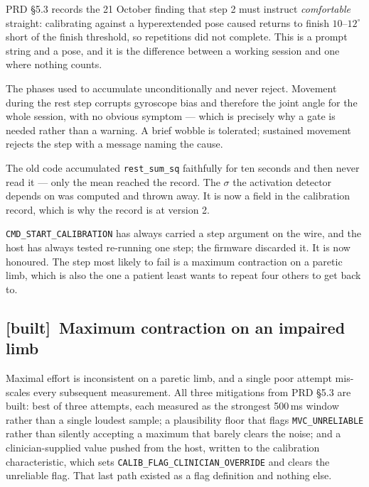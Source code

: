 \documentclass[11pt]{article}
\newcommand{\built}{{\sffamily\scriptsize\color{good}\textbf{[built]}}\ }
\begin{document}
\begin{description}[leftmargin=0pt,style=unboxed,itemsep=5pt]

\item[\textcolor{marker}{``Comfortable straight'', not ``hanging down''.}] PRD
\S5.3 records the 21 October finding that step 2 must instruct \emph{comfortable}
straight: calibrating against a hyperextended pose caused returns to finish
$10$--$12^{\circ}$ short of the finish threshold, so repetitions did not
complete. This is a prompt string and a pose, and it is the difference between
a working session and one where nothing counts.

\item[\textcolor{marker}{Stillness gates on steps 1 and 2.}] The phases used
to accumulate unconditionally and never reject. Movement during the rest step
corrupts gyroscope bias and therefore the joint angle for the whole session,
with no obvious symptom --- which is precisely why a gate is needed rather
than a warning. A brief wobble is tolerated; sustained movement rejects the
step with a message naming the cause.

\item[\textcolor{marker}{$\sigma$ is captured and kept.}] The old code
accumulated \texttt{rest\_sum\_sq} faithfully for ten seconds and then never
read it --- only the mean reached the record. The $\sigma$ the activation
detector depends on was computed and thrown away. It is now a field in the
calibration record, which is why the record is at version 2.

\item[\textcolor{marker}{Steps are individually commanded.}]
\texttt{CMD\_START\_CALIBRATION} has always carried a step argument on the
wire, and the host has always tested re-running one step; the firmware
discarded it. It is now honoured. The step most likely to fail is a maximum
contraction on a paretic limb, which is also the one a patient least wants to
repeat four others to get back to.

\end{description}

\subsection{\built Maximum contraction on an impaired limb}

Maximal effort is inconsistent on a paretic limb, and a single poor attempt
mis-scales every subsequent measurement. All three mitigations from PRD \S5.3
are built: best of three attempts, each measured as the strongest 500\,ms
window rather than a single loudest sample; a plausibility floor that flags
\texttt{MVC\_UNRELIABLE} rather than silently accepting a maximum that barely
clears the noise; and a clinician-supplied value pushed from the host, written
to the calibration characteristic, which sets
\texttt{CALIB\_FLAG\_CLINICIAN\_OVERRIDE} and clears the unreliable flag. That
last path existed as a flag definition and nothing else.
\end{document}
